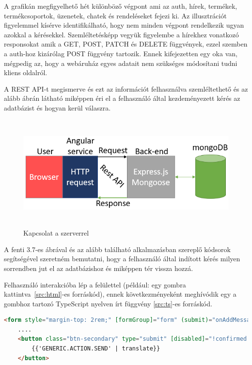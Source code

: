  A grafikán megfigyelhető hét különböző végpont ami az auth, hírek, termékek, termékcsoportok, üzenetek, chatek és rendeléseket fejezi ki. Az illusztrációt figyelemmel kísérve identifikálható, hogy nem minden végpont rendelkezik ugyan azokkal a kérésekkel. Szemléltetésképp vegyük figyelembe a hírekhez vonatkozó responsokat amik a GET, POST, PATCH és DELETE függvények, ezzel szemben a auth-hoz kizárólag POST függvény tartozik. Ennek kifejezetten egy oka van, mégpedig az, hogy a webáruház egyes adatait nem szükséges módosítani tudni kliens oldalról.

\bigskip
A REST API-t megismerve és ezt az információt felhasználva szemléltethető és az alább ábrán látható miképpen éri el a felhasználó által kezdeményezett kérés az adatbázist és hogyan kerül válaszra.

\begin{figure}[H]
	\centering
	\includegraphics[width=1.0\textwidth,height=220px]{images/kapcsolat_szerver_bemutatas.png}
	\caption{Kapcsolat a szerverrel}
	\label{fig.picture-7}
\end{figure}

A fenti 3.7-es ábrával és az alább található alkalmazásban szereplő kódsorok segítségével szeretném bemutatni, hogy a felhasználó által indított kérés milyen sorrendben jut el az adatbázishoz és miképpen tér vissza hozzá.

\bigskip
Felhasználó interakcióba lép a felülettel (például: egy gombra kattintva~\ref{src:html}-es forráskód), ennek következményeként meghívódik egy a gombhoz tartozó TypeScript nyelven írt függvény \ref{src:ts}-es forráskód.

\begin{lstlisting}[language=html]
	<form style="margin-top: 2rem;" [formGroup]="form" (submit)="onAddMessage()" *ngIf="!isLoading">
	....
	<button class="btn-secondary" type="submit" [disabled]="!confirmed.checked">
		{{'GENERIC.ACTION.SEND' | translate}}
	</button>
\end{lstlisting}

